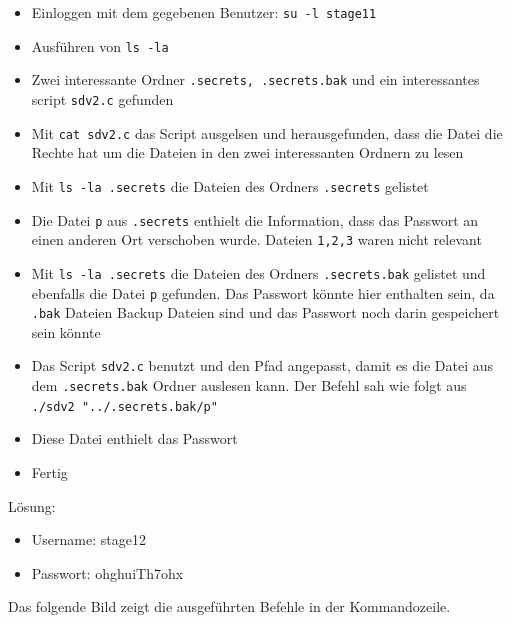 \documentclass[12pt, a4paper, titlepage, oneside]{scrartcl}
\begin{document}
	\begin{itemize}
		\item Einloggen mit dem gegebenen Benutzer: \lstinline{su -l stage11}

		\item Ausführen von \lstinline{ls -la}

		\item Zwei interessante Ordner \lstinline{.secrets, .secrets.bak} und ein
			interessantes script \lstinline{sdv2.c} gefunden

		\item Mit \lstinline{cat sdv2.c} das Script ausgelsen und herausgefunden, dass
			die Datei die Rechte hat um die Dateien in den zwei interessanten Ordnern zu
			lesen

		\item Mit \lstinline{ls -la .secrets} die Dateien des Ordners \lstinline{.secrets}
			gelistet

		\item Die Datei \lstinline{p} aus \lstinline{.secrets} enthielt die Information,
			dass das Passwort an einen anderen Ort verschoben wurde. Dateien \lstinline{1,2,3}
			waren nicht relevant

		\item Mit \lstinline{ls -la .secrets} die Dateien des Ordners \lstinline{.secrets.bak}
			gelistet und ebenfalls die Datei \lstinline{p} gefunden. Das Passwort könnte
			hier enthalten sein, da \lstinline{.bak} Dateien Backup Dateien sind und das
			Passwort noch darin gespeichert sein könnte

		\item Das Script \lstinline{sdv2.c} benutzt und den Pfad angepasst, damit es
			die Datei aus dem \lstinline{.secrets.bak} Ordner auslesen kann. Der Befehl
			sah wie folgt aus \\ \lstinline{./sdv2 "../.secrets.bak/p"}

		\item Diese Datei enthielt das Passwort

		\item Fertig
	\end{itemize}

	Lösung:
	\begin{itemize}
		\item Username: stage12

		\item Passwort: ohghuiTh7ohx
	\end{itemize}

	Das folgende Bild zeigt die ausgeführten Befehle in der Kommandozeile.
\end{document}

